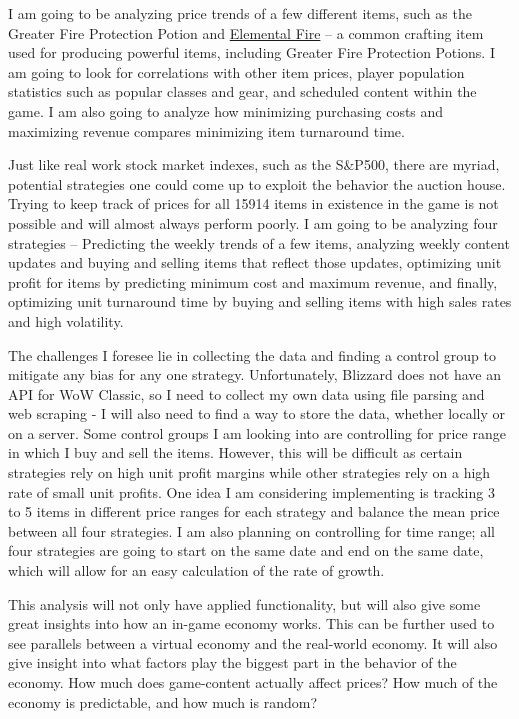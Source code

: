 \documentclass[sigconf]{acmart}
\begin{document}
I am going to be analyzing price trends of a few different items, such as the Greater Fire Protection Potion and \href{https://classic.wowhead.com/item=7068/elemental-fire}{Elemental Fire} – a common crafting item used for producing powerful items, including Greater Fire Protection Potions. I am going to look for correlations with other item prices, player population statistics such as popular classes and gear, and scheduled content within the game. I am also going to analyze how minimizing purchasing costs and maximizing revenue compares minimizing item turnaround time.

Just like real work stock market indexes, such as the S\&P500, there are myriad, potential strategies one could come up to exploit the behavior the auction house. Trying to keep track of prices for all 15914 items in existence in the game is not possible and will almost always perform poorly. I am going to be analyzing four strategies – Predicting the weekly trends of a few items, analyzing weekly content updates and buying and selling items that reflect those updates, optimizing unit profit for items by predicting minimum cost and maximum revenue, and finally, optimizing unit turnaround time by buying and selling items with high sales rates and high volatility.

The challenges I foresee lie in collecting the data and finding a control group to mitigate any bias for any one strategy. Unfortunately, Blizzard does not have an API for WoW Classic, so I need to collect my own data using file parsing and web scraping - I will also need to find a way to store the data, whether locally or on a server. Some control groups I am looking into are controlling for price range in which I buy and sell the items. However, this will be difficult as certain strategies rely on high unit profit margins while other strategies rely on a high rate of small unit profits. One idea I am considering implementing is tracking 3 to 5 items in different price ranges for each strategy and balance the mean price between all four strategies. I am also planning on controlling for time range; all four strategies are going to start on the same date and end on the same date, which will allow for an easy calculation of the rate of growth.

This analysis will not only have applied functionality, but will also give some great insights into how an in-game economy works. This can be further used to see parallels between a virtual economy and the real-world economy. It will also give insight into what factors play the biggest part in the behavior of the economy. How much does game-content actually affect prices? How much of the economy is predictable, and how much is random?
\end{document}
